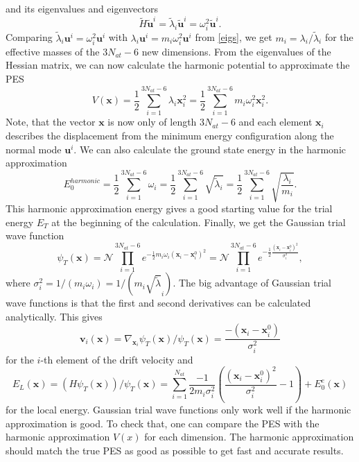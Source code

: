 \documentclass [12pt]{report}
\begin{document}
and its eigenvalues and eigenvectors
\begin{equation}
\tilde{H} \bm{\tilde{u}}^i = \tilde{\lambda}_i \bm{\tilde{u}}^i = \omega_i^2 \bm{\tilde{u}}^i.
\end{equation}
Comparing $\tilde{\lambda}_i \bm{u}^i = \omega_i^2 \bm{u}^i$ with $\lambda_i \bm{u}^i = m_i \omega_i^2 \bm{u}^i$ from \eqref{eigs}, we get $m_i = \lambda_i / \tilde{\lambda}_i$ for the effective masses of the $3 N_{at} - 6$ new dimensions.
From the eigenvalues of the Hessian matrix, we can now calculate the harmonic potential to approximate the PES
\begin{equation}
V(\bm{x}) = \frac{1}{2} \sum_{i=1}^{3N_{at}-6} \lambda_i \bm{x}_i^2 = \frac{1}{2} \sum_{i=1}^{3N_{at}-6} m_i \omega_i^2 \bm{x}_i^2.
\end{equation}
Note, that the vector $\bm{x}$ is now only of length $3 N_{at} - 6$ and  each element $\bm{x}_i$ describes the displacement from the minimum energy configuration along the normal mode $\bm{u}^i$.
We can also calculate the ground state energy in the harmonic approximation
\begin{equation}
E_0^{harmonic} = \frac{1}{2} \sum_{i=1}^{3N_{at}-6} \omega_i = \frac{1}{2}\sum_{i=1}^{3N_{at}-6}  \sqrt{\tilde{\lambda}_i} = \frac{1}{2} \sum_{i=1}^{3N_{at}-6}  \sqrt{\frac{\lambda_i}{m_i}}.
\end{equation}
This harmonic approximation energy gives a good starting value for the trial energy $E_T$ at the beginning of the calculation. Finally, we get the Gaussian trial wave function
\begin{equation}
\psi_T(\bm{x}) = \mathcal{N} \prod_{i=1}^{3N_{at}-6}  e^{-\frac{1}{2} m_i \omega_i (\bm{x}_i - \bm{x}^0_i)^2} = \mathcal{N} \prod_{i=1}^{3N_{at}-6} e^{-\frac{1}{2} \frac{(\bm{x}_i - \bm{x}^0_i)^2}{\sigma_i^2}},
\end{equation}
where $\sigma_i^2 = 1/(m_i \omega_i) = 1/(m_i\sqrt{\tilde{\lambda}}_i)$. The big advantage of Gaussian trial wave functions is that the first and second derivatives can be calculated analytically. This gives
\begin{equation}
\bm{v}_i(\bm{x}) = \nabla_{\bm{x}_i} \psi_T(\bm{x})/ \psi_T(\bm{x}) = \frac{-(\bm{x}_i - \bm{x}^0_i)}{\sigma_i^2}
\end{equation}
for the $i$-th element of the drift velocity and 
\begin{equation}\label{el}
E_L(\bm{x}) = (H\psi_T(\bm{x}))/\psi_T(\bm{x}) = \sum_{i=1}^{N_{at}} \frac{-1}{2m_i \sigma^2_i} \left( \frac{(\bm{x}_i - \bm{x}^0_i)^2}{\sigma^2_i} - 1 \right) + E_0^e(\bm{x})
\end{equation}
for the local energy.
Gaussian trial wave functions only work well if the harmonic approximation is good. To check that, one can compare the PES with the harmonic approximation $V(x)$ for each dimension. The harmonic approximation should match the true PES as good as possible to get fast and accurate results.
\end{document}
